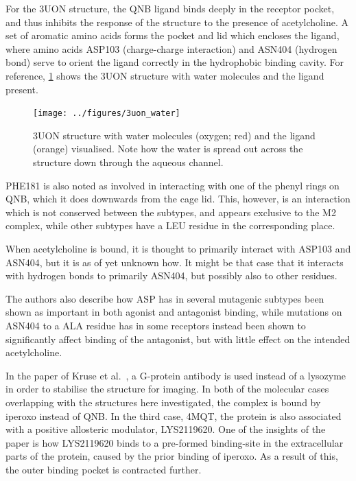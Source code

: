 \documentclass[10pt]{article}\usepackage[]{graphicx}\usepackage[]{color}
\theoremstyle{plain}
\begin{document}
\begin{multicols*}{2}
  For the 3UON structure, the QNB ligand binds deeply in the receptor pocket, and thus inhibits the response of the structure to the presence of acetylcholine. A set of aromatic amino acids forms the pocket and lid which encloses the ligand, where amino acids ASP103 (charge-charge interaction) and ASN404 (hydrogen bond) serve to orient the ligand correctly in the hydrophobic binding cavity. For reference, \cref{fig:3uon_water} shows the 3UON structure with water molecules and the ligand present. 

\begin{figure}[H]
  \centering
    \texttt{[image: ../figures/3uon\_water]}
  \caption{3UON structure with water molecules (oxygen; red) and the ligand (orange) visualised. Note how the water is spread out across the structure down through the aqueous channel.} 
  \label{fig:3uon_water}
\end{figure}

\noindent
  PHE181 is also noted as involved in interacting with one of the phenyl rings on QNB, which it does downwards from the cage lid. This, however, is an interaction which is not conserved between the subtypes, and appears exclusive to the M2 complex, while other subtypes have a LEU residue in the corresponding place. 

When acetylcholine is bound, it is thought to primarily interact with ASP103 and ASN404, but it is as of yet unknown how. It might be that case that it interacts with hydrogen bonds to primarily ASN404, but possibly also to other residues.

  The authors also describe how ASP has in several mutagenic subtypes been shown as important in both agonist and antagonist binding, while mutations on ASN404 to a ALA residue has in some receptors instead been shown to significantly affect binding of the antagonist, but with little effect on the intended acetylcholine.
  
In the paper of Kruse et al.~\cite{Kruse2013}, a G-protein antibody is used instead of a lysozyme in order to stabilise the structure for imaging. In both of the molecular cases overlapping with the structures here investigated, the complex is bound by iperoxo instead of QNB. In the third case, 4MQT, the protein is also associated with a positive allosteric modulator, LYS2119620. One of the insights of the paper is how LYS2119620 binds to a pre-formed binding-site in the extracellular parts of the protein, caused by the prior binding of iperoxo. As a result of this, the outer binding pocket is contracted further. 


\end{multicols*}
\end{document}
